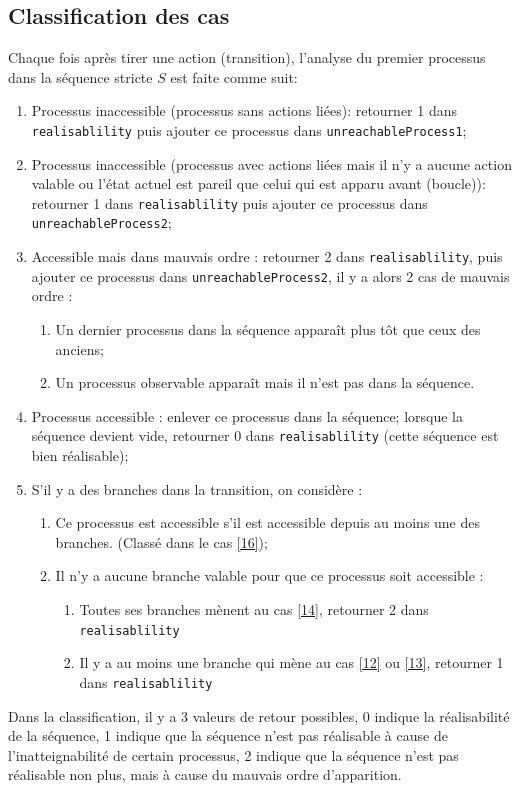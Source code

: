 \documentclass[11pt]{report}
\theoremstyle{definition}
\begin{document}
\subsection{Classification des cas}\label{class}
Chaque fois apr\`es tirer une action (transition), l'analyse du premier processus dans la s\'equence stricte $S$ est faite comme suit:
\begin{enumerate}[label=\arabic*,align=left]
	\item Processus inaccessible (processus sans actions li\'ees): retourner 1 dans \texttt{realisablility} puis ajouter ce processus dans \texttt{unreachableProcess1};\label{12}
	\item Processus inaccessible (processus avec actions li\'ees mais il n'y a aucune action valable ou l'\'etat actuel est pareil que celui qui est apparu avant (boucle)): retourner 1 dans \texttt{realisablility} puis ajouter ce processus dans \texttt{unreachableProcess2};\label{13}
	\item Accessible mais dans mauvais ordre : retourner 2 dans \texttt{realisablility}, puis ajouter ce processus dans \texttt{unreachableProcess2}, il y a alors 2 cas de mauvais ordre :\label{14}
	\begin{enumerate}[label=\Roman*,align=left]\label{15}
		\item Un dernier processus dans la s\'equence appara\^it plus t\^ot que ceux des anciens;
		\item Un processus observable appara\^it mais il n'est pas dans la s\'equence.
	\end{enumerate}
	\item Processus accessible : enlever ce processus dans la s\'equence; lorsque la s\'equence devient vide, retourner 0 dans \texttt{realisablility} (cette s\'equence est bien r\'ealisable);\label{16}
	\item S'il y a des branches dans la transition, on consid\`ere : 
	\begin{enumerate}[label=\Roman*,align=left]
		\item Ce processus est accessible s'il est accessible depuis au moins une des branches. (Class\'e dans le cas \ref{16});
		\item Il n'y a aucune branche valable pour que ce processus soit accessible :
		\begin{enumerate}[label=\roman*,align=left]
			\item Toutes ses branches m\`enent au cas \ref{14}, retourner 2 dans \texttt{realisablility}
			\item Il y a au moins une branche qui m\`ene au cas \ref{12} ou \ref{13}, retourner 1 dans \texttt{realisablility}
		\end{enumerate}
	\end{enumerate}
\end{enumerate}
Dans la classification, il y a 3 valeurs de retour possibles, 0 indique la r\'ealisabilit\'e de la s\'equence, 1 indique que la s\'equence n'est pas r\'ealisable \`a cause de l'inatteignabilit\'e de certain processus, 2 indique que la s\'equence n'est pas r\'ealisable non plus, mais \`a cause du mauvais ordre d'apparition.
\end{document}
